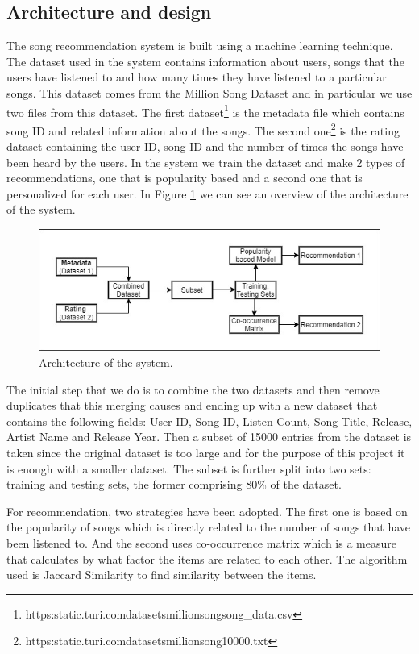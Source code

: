 \documentclass{jot}
\begin{document}
\subsection{Architecture and design}
The song recommendation system is built using a machine learning technique. The dataset used in the system contains information about users, songs that the users have listened to and how many times they have listened to a particular songs. This dataset comes from the Million Song Dataset\cite{millionsongs} and in particular we use two files from this dataset. The first dataset\footnote{https:\/\/static.turi.com\/datasets\/millionsong\/song\_data.csv} is the metadata file which contains song ID and related information about the songs. The second one\footnote{https:\/\/static.turi.com\/datasets\/millionsong\/10000.txt} is the rating dataset containing the user ID, song ID and the number of times the songs have been heard by the users. In the system we train the dataset and make 2 types of recommendations, one that is popularity based and a second one that is personalized for each user. In Figure \ref{fig:architecture} we can see an overview of the architecture of the system.

\begin{figure}[h!]
    \centering%
    \includegraphics[width=\textwidth]{architecture}
    \caption{Architecture of the system.}
    \label{fig:architecture}
\end{figure}%

The initial step that we do is to combine the two datasets and then remove duplicates that this merging causes and ending up with a new dataset that contains the following fields: User ID, Song ID, Listen Count, Song Title, Release, Artist Name and Release Year. Then a subset of 15000 entries from the dataset is taken since the original dataset is too large and for the purpose of this project it is enough with a smaller dataset. The subset is further split into two sets: training and testing sets, the former comprising 80\% of the dataset.

For recommendation, two strategies have been adopted. The first one is based on the popularity of songs which is directly related to the number of songs that have been listened to. And the second uses co-occurrence matrix which is a measure that calculates by what factor the items are related to each other. The algorithm used is Jaccard Similarity to find similarity between the items.
\end{document}
